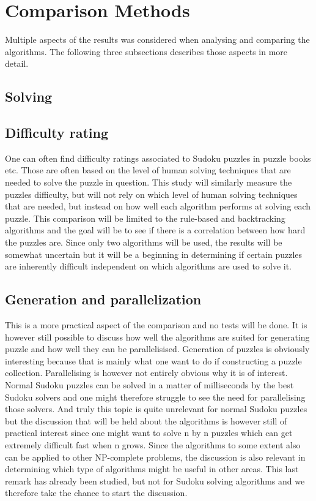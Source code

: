 \documentclass[a4paper,11pt]{kth-mag}
\begin{document}
\section{Comparison Methods}
Multiple aspects of the results was considered when analysing and comparing the algorithms. The following three subsections describes those aspects in more detail. 
\subsection{Solving}
\subsection{Difficulty rating}
One can often find difficulty ratings associated to Sudoku puzzles in puzzle books etc. Those are often based on the level of human solving techniques that are needed to solve the puzzle in question. \cite{difficulty} 
This study will similarly measure the puzzles difficulty, but will not rely on which level of human solving techniques that are needed, but instead on how well each algorithm performs at solving each puzzle. 
This comparison will be limited to the rule-based and backtracking algorithms and the goal will be to see if there is a correlation between how hard the puzzles are. 
Since only two algorithms will be used, the results will be somewhat uncertain but it will be a beginning in determining if certain puzzles are inherently difficult independent on which algorithms are used to solve it.

\subsection{Generation and parallelization}
This is a more practical aspect of the comparison and no tests will be done. It is however still possible to discuss how well the algorithms are suited for generating puzzle and how well they can be parallelisised. Generation of puzzles is obviously interesting because that is mainly what one want to do if constructing a puzzle collection. Parallelising is however not entirely obvious why it is of interest. Normal Sudoku puzzles can be solved in a matter of milliseconds by the best Sudoku solvers and one might therefore struggle to see the need for parallelising those solvers. And truly this topic is quite unrelevant for normal Sudoku puzzles but the discussion that will be held about the algorithms is however still of practical interest since one might want to solve n by n puzzles which can get extremely difficult fast when n grows. Since the algorithms to some extent also can be applied to other NP-complete problems, the discussion is also relevant in determining which type of algorithms might be useful in other areas. This last remark has already been studied, but not for Sudoku solving algorithms and we therefore take the chance to start the discussion.
\end{document}
